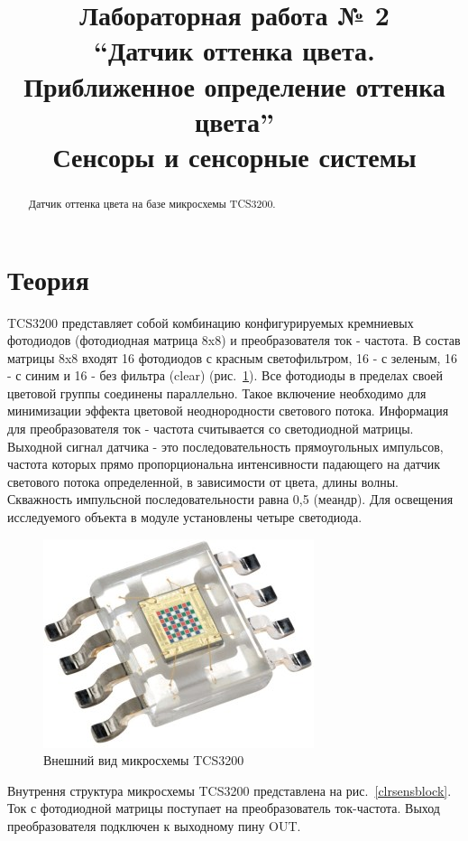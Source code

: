 \documentclass[12pt]{article}
\title{Лабораторная работа № 2 \\
``Датчик оттенка цвета. Приближенное определение оттенка цвета'' \\
\large Сенсоры и сенсорные системы}
\begin{document}
\maketitle
\tableofcontents
\begin{abstract}
    Датчик оттенка цвета на базе микросхемы TCS3200.
\end{abstract}

\section{Теория}

TCS3200 представляет собой комбинацию конфигурируемых кремниевых фотодиодов (фотодиодная матрица 8x8) и преобразователя ток - частота. В состав матрицы 8x8 входят 16 фотодиодов с красным светофильтром, 16 - с зеленым, 16 - с синим и 16 - без фильтра (clear) (рис.~\ref{clrsens}). Все фотодиоды в пределах своей цветовой группы соединены параллельно. Такое включение необходимо для минимизации эффекта цветовой неоднородности светового потока. Информация для преобразователя ток - частота считывается со светодиодной матрицы. Выходной сигнал датчика - это последовательность прямоугольных импульсов, частота которых прямо пропорциональна интенсивности падающего на датчик светового потока определенной, в зависимости от цвета, длины волны. Скважность импульсной последовательности равна 0,5 (меандр). Для освещения исследуемого объекта в модуле установлены четыре светодиода.

\begin{figure}[H]
    \centering
    \includegraphics[scale=0.8]{images/TCS3200.jpg}
    \caption{Внешний вид микросхемы TCS3200}\label{clrsens}
\end{figure}

Внутрення структура микросхемы TCS3200 представлена на рис.~\ref{clrsensblock}. Ток с фотодиодной матрицы поступает на преобразователь ток-частота. Выход преобразователя подключен к выходному пину OUT.
\end{document}
